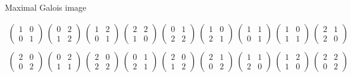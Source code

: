\documentclass[10pt]{beamer}
\begin{document}
\begin{frame}[t]{Maximal Galois image}
\begin{example}
\vspace{-0.4cm} {\scriptsize
$$
\begin{array}{c}
\begin{pmatrix} 1 & 0 \\ 0 & 1 \end{pmatrix} \ \begin{pmatrix} 0 & 2 \\ 1 & 2 \end{pmatrix} \ \begin{pmatrix} 1 & 2 \\ 0 & 1 \end{pmatrix} \ \begin{pmatrix} 2 & 2 \\ 1 & 0 \end{pmatrix} \ \begin{pmatrix} 0 & 1 \\ 2 & 2 \end{pmatrix} \ \begin{pmatrix} 1 & 0 \\ 2 & 1 \end{pmatrix} \ \begin{pmatrix} 1 & 1 \\ 0 & 1 \end{pmatrix} \ \begin{pmatrix} 1 & 0 \\ 1 & 1 \end{pmatrix} \ \begin{pmatrix} 2 & 1 \\ 2 & 0 \end{pmatrix} \\ \\
\begin{pmatrix} 2 & 0 \\ 0 & 2 \end{pmatrix} \ \begin{pmatrix} 0 & 2 \\ 1 & 1 \end{pmatrix} \ \begin{pmatrix} 2 & 0 \\ 2 & 2 \end{pmatrix} \ \begin{pmatrix} 0 & 1 \\ 2 & 1 \end{pmatrix} \ \begin{pmatrix} 2 & 0 \\ 1 & 2 \end{pmatrix} \ \begin{pmatrix} 2 & 1 \\ 0 & 2 \end{pmatrix} \ \begin{pmatrix} 1 & 1 \\ 2 & 0 \end{pmatrix} \ \begin{pmatrix} 1 & 2 \\ 1 & 0 \end{pmatrix} \ \begin{pmatrix} 2 & 2 \\ 0 & 2 \end{pmatrix} \\ \\

\end{array}$$}
\end{example}
\end{frame}
\end{document}
